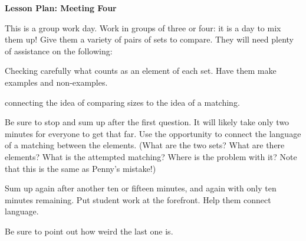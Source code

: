 \documentclass[12pt]{amsart}
\theoremstyle{definition}
\begin{document}
\begin{center}
\textbf{\Huge
Lesson Plan: Meeting Four
}
\end{center}
\vspace{.5in}


This is a group work day.
Work in groups of three or four: it is a day to mix them up!
Give them a variety of pairs of sets to compare.
They will need plenty of assistance on the following:
\begin{compactitem}
\item Checking carefully what counts as an element of each set.
Have them make examples and non-examples.

\item connecting the idea of comparing sizes to the idea of a matching.
\end{compactitem}

\vspace{.25in}

Be sure to stop and sum up after the first question.
It will likely take only two minutes for everyone to get that far.
Use the opportunity to connect the language of a matching between the elements.
(What are the two sets? What are there elements? What is the attempted matching? Where is the problem with it? Note that this is the same as Penny's mistake!)

\vspace{.25in}

Sum up again after another ten or fifteen minutes, and again with only ten minutes remaining.
Put student work at the forefront.
Help them connect language.

\vspace{.25in}

Be sure to point out how weird the last one is.
\end{document}
